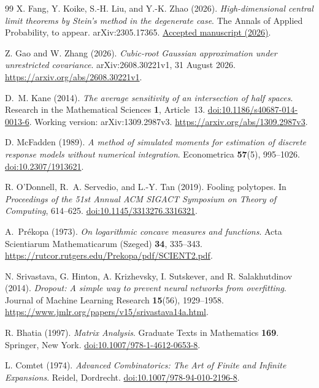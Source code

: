 \documentclass[11pt,letterpaper]{article}
\theoremstyle{remark}
\begin{document}
\begin{thebibliography}{99}
X. Fang, Y. Koike, S.-H. Liu, and Y.-K. Zhao (2026).
\emph{High-dimensional central limit theorems by Stein's method in
the degenerate case}. The Annals of Applied Probability, to appear.
arXiv:2305.17365.
\href{https://research.cuhk.edu.hk/en/publications/high-dimensional-central-limit-theorems-by-steins-method-in-the-d/}{Accepted manuscript (2026)}.

Z. Gao and W. Zhang (2026).
\emph{Cubic-root Gaussian approximation under unrestricted covariance}.
arXiv:2608.30221v1, 31 August 2026.
\url{https://arxiv.org/abs/2608.30221v1}.

D.~M. Kane (2014).
\emph{The average sensitivity of an intersection of half spaces}.
Research in the Mathematical Sciences \textbf{1}, Article~13.
\href{https://doi.org/10.1186/s40687-014-0013-6}{doi:10.1186/s40687-014-0013-6}.
Working version: arXiv:1309.2987v3.
\url{https://arxiv.org/abs/1309.2987v3}.

D. McFadden (1989).
\emph{A method of simulated moments for estimation of discrete
response models without numerical integration}.
Econometrica \textbf{57}(5), 995--1026.
\href{https://doi.org/10.2307/1913621}{doi:10.2307/1913621}.

R. O'Donnell, R.~A. Servedio, and L.-Y. Tan (2019).
Fooling polytopes.
In \emph{Proceedings of the 51st Annual ACM SIGACT Symposium on
Theory of Computing}, 614--625.
\href{https://doi.org/10.1145/3313276.3316321}{doi:10.1145/3313276.3316321}.

A.~Pr\'ekopa (1973).
\emph{On logarithmic concave measures and functions}.
Acta Scientiarum Mathematicarum (Szeged) \textbf{34}, 335--343.
\url{https://rutcor.rutgers.edu/Prekopa/pdf/SCIENT2.pdf}.

N. Srivastava, G. Hinton, A. Krizhevsky, I. Sutskever, and
R. Salakhutdinov (2014).
\emph{Dropout: A simple way to prevent neural networks from overfitting}.
Journal of Machine Learning Research \textbf{15}(56), 1929--1958.
\url{https://www.jmlr.org/papers/v15/srivastava14a.html}.

R. Bhatia (1997).
\emph{Matrix Analysis}.
Graduate Texts in Mathematics \textbf{169}. Springer, New York.
\href{https://doi.org/10.1007/978-1-4612-0653-8}{doi:10.1007/978-1-4612-0653-8}.

L. Comtet (1974).
\emph{Advanced Combinatorics: The Art of Finite and Infinite Expansions}.
Reidel, Dordrecht.
\href{https://doi.org/10.1007/978-94-010-2196-8}{doi:10.1007/978-94-010-2196-8}.


\end{thebibliography}
\end{document}
